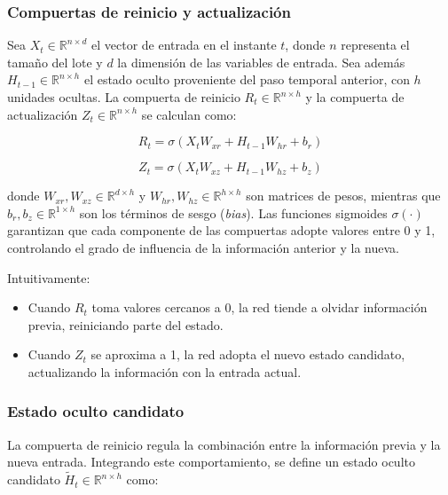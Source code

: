 \subsubsection{Compuertas de reinicio y actualización}
\justify
Sea $X_t \in \mathbb{R}^{n \times d}$ el vector de entrada en el instante $t$, donde $n$ representa el tamaño del lote y $d$ la dimensión de las variables de entrada.
\justify
Sea además $H_{t-1} \in \mathbb{R}^{n \times h}$ el estado oculto proveniente del paso temporal anterior, con $h$ unidades ocultas.
\justify
La compuerta de reinicio $R_t \in \mathbb{R}^{n \times h}$ y la compuerta de actualización $Z_t \in \mathbb{R}^{n \times h}$ se calculan como:

\begin{equation}
R_t = \sigma(X_t W_{xr} + H_{t-1} W_{hr} + b_r)
\end{equation}

\begin{equation}
Z_t = \sigma(X_t W_{xz} + H_{t-1} W_{hz} + b_z)
\end{equation}

\justify
donde $W_{xr}, W_{xz} \in \mathbb{R}^{d \times h}$ y $W_{hr}, W_{hz} \in \mathbb{R}^{h \times h}$ son matrices de pesos, mientras que $b_r, b_z \in \mathbb{R}^{1 \times h}$ son los términos de sesgo (\textit{bias}).
\justify
Las funciones sigmoides $\sigma(\cdot)$ garantizan que cada componente de las compuertas adopte valores entre 0 y 1, controlando el grado de influencia de la información anterior y la nueva.

\justify
Intuitivamente:
\begin{itemize}
\item Cuando $R_t$ toma valores cercanos a 0, la red tiende a olvidar información previa, reiniciando parte del estado.
\item Cuando $Z_t$ se aproxima a 1, la red adopta el nuevo estado candidato, actualizando la información con la entrada actual.
\end{itemize}

\subsubsection{Estado oculto candidato}

\justify
La compuerta de reinicio regula la combinación entre la información previa y la nueva entrada.
\justify
Integrando este comportamiento, se define un estado oculto candidato $\tilde{H}_t \in \mathbb{R}^{n \times h}$ como:

